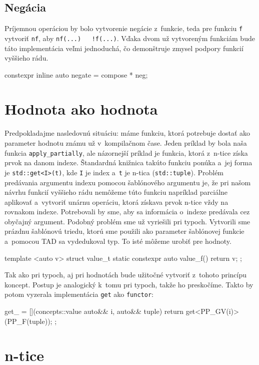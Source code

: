 \subsection{Negácia}

Príjemnou operáciou by bolo vytvorenie negácie z~funkcie, teda pre funkciu \texttt{f} vytvoriť \texttt{nf}, aby \texttt{nf(...) ~ !f(...)}. Vďaka dvom už vytvoreným funkciám bude táto implementácia veľmi jednoduchá, čo demonštruje zmysel podpory funkcií vyššieho rádu.
\begin{code}
constexpr inline auto negate = compose * neg;
\end{code}

\section{Hodnota ako hodnota}

Predpokladajme nasledovnú situáciu: máme funkciu, ktorá potrebuje dostať ako parameter hodnotu známu už v~kompilačnom čase. Jeden príklad by bola naša funkcia \texttt{apply\_partially}, ale názornejší príklad je funkcia, ktorá z~n-tice získa prvok na danom indexe. Štandardná knižnica takúto funkciu ponúka a~jej forma je \texttt{std::get<I>(t)}, kde \texttt{I} je index a~\texttt{t} je n-tica (\texttt{std::tuple}). Problém predávania argumentu indexu pomocou šablónového argumentu je, že pri našom návrhu funkcií vyššieho rádu nemôžeme túto funkciu napríklad parciálne aplikovať a~vytvoriť unárnu operáciu, ktorá získava prvok n-tice vždy na rovnakom indexe. Potrebovali by sme, aby sa informácia o~indexe predávala cez obyčajný argument. Podobný problém sme už vyriešili pri typoch. Vytvorili sme prázdnu šablónovú triedu, ktorú sme použili ako parameter šablónovej funkcie a~pomocou TAD sa vydedukoval typ. To isté môžeme urobiť pre hodnoty.
\begin{code}
template <auto v>
struct value_t { static constexpr auto value_f() { return v; } };
\end{code}
Tak ako pri typoch, aj pri hodnotách bude užitočné vytvoriť z~tohoto princípu koncept. Postup je analogický k~tomu pri typoch, takže ho preskočíme. Takto by potom vyzerala implementácia \texttt{get} ako \texttt{functor}:
\begin{code}
get_ = [](concepts::value auto&& i, auto&& tuple)
       { return get<PP_GV(i)>(PP_F(tuple)); };
\end{code}

\section{n-tice}

